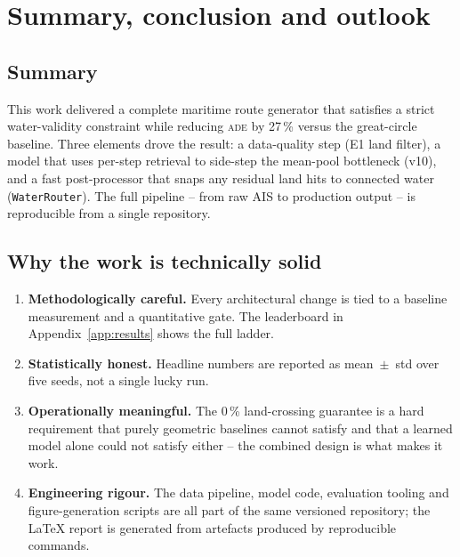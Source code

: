 \documentclass[11pt,a4paper]{article}
\newcommand{\ade}{\textsc{ade}}
\newcommand{\code}[1]{\texttt{\small #1}}
\begin{document}
\section{Summary, conclusion and outlook}\label{sec:conclusion}

\subsection{Summary}

This work delivered a complete maritime route generator that satisfies a
strict water-validity constraint while reducing \ade{} by 27\,\% versus
the great-circle baseline.  Three elements drove the result: a
data-quality step (E1 land filter), a model that uses per-step
retrieval to side-step the mean-pool bottleneck (v10), and a fast
post-processor that snaps any residual land hits to connected water
(\code{WaterRouter}).  The full pipeline -- from raw AIS to production
output -- is reproducible from a single repository.

\subsection{Why the work is technically solid}

\begin{enumerate}[leftmargin=*]
  \item \textbf{Methodologically careful.}  Every architectural change is
        tied to a baseline measurement and a quantitative gate.  The
        leaderboard in Appendix~\ref{app:results} shows the full ladder.
  \item \textbf{Statistically honest.}  Headline numbers are reported as
        mean~$\pm$~std over five seeds, not a single lucky run.
  \item \textbf{Operationally meaningful.}  The 0\,\% land-crossing
        guarantee is a hard requirement that purely geometric baselines
        cannot satisfy and that a learned model alone could not satisfy
        either -- the combined design is what makes it work.
  \item \textbf{Engineering rigour.}  The data pipeline, model code,
        evaluation tooling and figure-generation scripts are all part of
        the same versioned repository; the LaTeX report is generated
        from artefacts produced by reproducible commands.
\end{enumerate}
\end{document}
